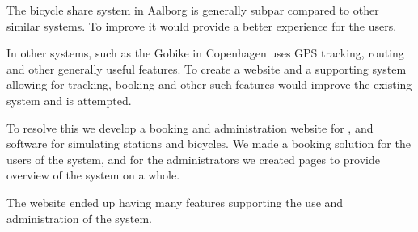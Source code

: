 The bicycle share system in Aalborg is generally subpar compared to other similar systems.
To improve it would provide a better experience for the users.

In other systems, such as the Gobike in Copenhagen uses GPS tracking, routing and other generally useful features. 
To create a website and a supporting system allowing for tracking, booking and other such features would improve the existing system and is attempted.

To resolve this we develop a booking and administration website for \bycykelwithoutspace, and software for simulating stations and bicycles. We made a booking solution for the users of the system, and for the administrators we created pages to provide overview of the system on a whole.

The website ended up having many features supporting the use and administration of the system.